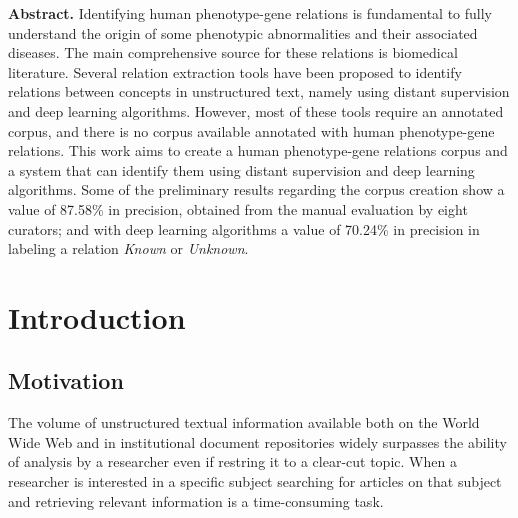 \documentclass[11pt]{article}
\renewcommand{\baselinestretch}{1.2}  %
\begin{document}

\begingroup

\renewcommand{\baselinestretch}{1.9}


\endgroup

\setmainfont{Times New Roman}


\vspace{1cm}

\textbf{Abstract.} Identifying human phenotype-gene relations is fundamental to fully understand the origin of some phenotypic abnormalities and their associated diseases. The main comprehensive source for these relations is biomedical literature. Several relation extraction tools have been proposed to identify relations between concepts in unstructured text, namely using distant supervision and deep learning algorithms. However, most of these tools require an annotated corpus, and there is no corpus available annotated with human phenotype-gene relations. This work aims to create a human phenotype-gene relations corpus and a system that can identify them using distant supervision and deep learning algorithms. Some of the preliminary results regarding the corpus creation show a value of 87.58\% in precision, obtained from the manual evaluation by eight curators; and with deep learning algorithms a value of 70.24\% in precision in labeling a relation \textit{Known} or \textit{Unknown}.


\section{Introduction}


\subsection{Motivation}

The volume of unstructured textual information available both on the World Wide Web and in institutional document repositories widely surpasses the ability of analysis by a researcher even if restring it to a clear-cut topic. When a researcher is interested in a specific subject searching for articles on that subject and retrieving relevant information is a time-consuming task.
\end{document}
